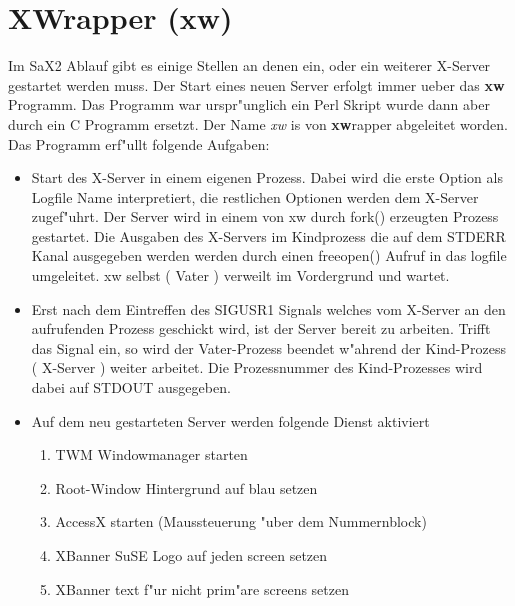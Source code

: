 \section{XWrapper (xw)}
\label{sec:xw}
Im SaX2 Ablauf gibt es einige Stellen an denen ein, oder ein 
weiterer X-Server gestartet werden muss. Der Start eines neuen 
Server erfolgt immer ueber das \textbf{xw} Programm.
Das Programm war urspr"unglich ein Perl Skript wurde dann aber
durch ein C Programm ersetzt. Der Name \textit{xw} is von \textbf{xw}rapper
abgeleitet worden. Das Programm erf"ullt folgende Aufgaben:
\begin{itemize}
\item Start des X-Server in einem eigenen Prozess. Dabei wird die erste
      Option als Logfile Name interpretiert, die restlichen Optionen 
      werden dem X-Server zugef"uhrt. Der Server wird in einem von
      xw durch fork() erzeugten Prozess gestartet. Die Ausgaben des
      X-Servers im Kindprozess die auf dem STDERR Kanal ausgegeben werden 
      werden durch einen freeopen() Aufruf in das logfile umgeleitet.
      xw selbst ( Vater ) verweilt im Vordergrund und wartet.
\item Erst nach dem Eintreffen des SIGUSR1 Signals welches vom X-Server
      an den aufrufenden Prozess geschickt wird, ist der Server bereit
      zu arbeiten. Trifft das Signal ein, so wird der Vater-Prozess 
      beendet w"ahrend der Kind-Prozess ( X-Server ) weiter arbeitet.
      Die Prozessnummer des Kind-Prozesses wird dabei auf STDOUT
      ausgegeben.
\item Auf dem neu gestarteten Server werden folgende Dienst aktiviert
      \begin{enumerate}
      \item TWM Windowmanager starten
      \item Root-Window Hintergrund auf blau setzen
      \item AccessX starten (Maussteuerung "uber dem Nummernblock)
      \item XBanner SuSE Logo auf jeden screen setzen
      \item XBanner text f"ur nicht prim"are screens setzen
      \end{enumerate}
\end{itemize}

